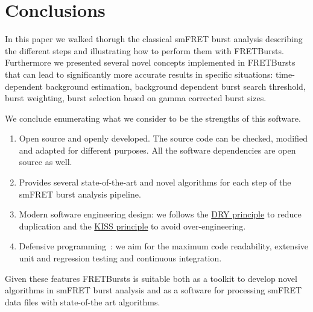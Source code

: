 \section{Conclusions}
\label{sec:conclusions}

In this paper we walked thorugh the classical smFRET burst analysis describing
the different steps and illustrating how to perform them with FRETBursts.
Furthermore we presented several novel concepts implemented in FRETBursts that 
can lead to significantly more accurate results in specific situations: 
time-dependent background estimation, background dependent burst search threshold,
burst weighting, burst selection based on gamma corrected burst sizes. 

We conclude enumerating what we consider to be the strengths
of this software.

\begin{enumerate}
\item Open source and openly developed. The source code can be checked, modified and
adapted for different purposes. All the software dependencies are open source as well.
\item Provides several state-of-the-art and novel algorithms for each step of the 
smFRET burst analysis pipeline. 
\item Modern software engineering design: we follows the \href{http://en.wikipedia.org/wiki/Don\%27t_repeat_yourself}{DRY principle} to reduce duplication and the \href{http://en.wikipedia.org/wiki/KISS_principle}{KISS principle} to avoid over-engineering.
\item Defensive programming~\cite{Prli__2012}: we aim for the maximum code readability,
extensive unit and regression testing and continuous integration.
\end{enumerate}

Given these features FRETBursts is suitable both as a toolkit to develop novel algorithms
in smFRET burst analysis and as a software for processing smFRET data files with
state-of-the art algorithms.
